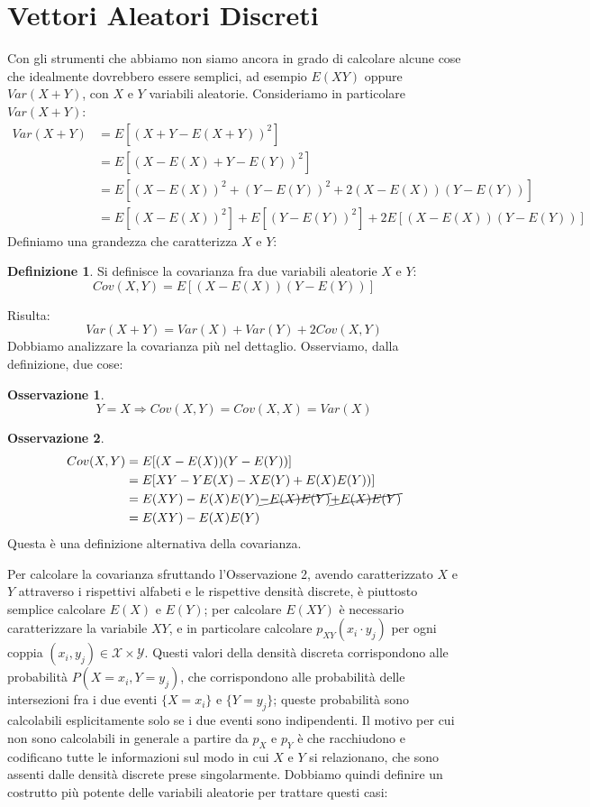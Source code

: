 \documentclass{article}
\theoremstyle{plain}
\theoremstyle{definition}
\newtheorem{definizione}{Definizione}[section]
\newtheorem{osservazione}{Osservazione}[section]
\theoremstyle{remark}
\begin{document}
\section{Vettori Aleatori Discreti} %
\label{sec:vettori_aleatori_discreti}
Con gli strumenti che abbiamo non siamo ancora in grado di calcolare alcune cose che idealmente dovrebbero essere semplici, ad esempio $E(XY)$ oppure $Var(X+Y)$, con $X$ e $Y$ variabili aleatorie. Consideriamo in particolare $Var(X+Y)$:
\begin{align*}
	Var(X+Y)&=E[(X+Y-E(X+Y))^2]\\
	&=E[(X-E(X)+Y-E(Y))^2]\\
	&=E[(X-E(X))^2+(Y-E(Y))^2+2(X-E(X))(Y-E(Y))]\\
	&=E[(X-E(X))^2]+E[(Y-E(Y))^2]+2E[(X-E(X))(Y-E(Y))]
\end{align*}
Definiamo una grandezza che caratterizza $X$ e $Y$:
\begin{definizione}
	Si definisce la covarianza fra due variabili aleatorie $X$ e $Y$:
	\begin{equation*}
		Cov(X,Y)=E[(X-E(X))(Y-E(Y))]
	\end{equation*}
\end{definizione}
Risulta:
\begin{equation*}
	Var(X+Y)=Var(X)+Var(Y)+2Cov(X,Y)
\end{equation*}
Dobbiamo analizzare la covarianza più nel dettaglio. Osserviamo, dalla definizione, due cose:
\begin{osservazione}
	\begin{equation*}
		Y=X \Rightarrow Cov(X,Y)=Cov(X,X)=Var(X)
	\end{equation*}
\end{osservazione}
\begin{osservazione}
	\begin{align*}
		Cov(X,Y)&=E[(X-E(X))(Y-E(Y))]\\
		&=E[XY-YE(X)-XE(Y)+E(X)E(Y))]\\
		&=E(XY)-E(X)E(Y)\cancel{-E(X)E(Y)}\cancel{+E(X)E(Y)}\\
		&=E(XY)-E(X)E(Y)
	\end{align*}
	Questa è una definizione alternativa della covarianza.
\end{osservazione}
Per calcolare la covarianza sfruttando l'Osservazione 2, avendo caratterizzato $X$ e $Y$ attraverso i rispettivi alfabeti e le rispettive densità discrete, è piuttosto semplice calcolare $E(X)$ e $E(Y)$; per calcolare $E(XY)$ è necessario caratterizzare la variabile $XY$, e in particolare calcolare $p_{XY}(x_i\cdot y_j)$ per ogni coppia $(x_i,y_j)\in\mathcal{X}\times\mathcal{Y}$. Questi valori della densità discreta corrispondono alle probabilità $P(X=x_i,Y=y_j)$, che corrispondono alle probabilità delle intersezioni fra i due eventi $\{X=x_i\}$ e $\{Y=y_j\}$; queste probabilità sono calcolabili esplicitamente solo se i due eventi sono indipendenti. Il motivo per cui non sono calcolabili in generale a partire da $p_X$ e $p_Y$ è che racchiudono e codificano tutte le informazioni sul modo in cui $X$ e $Y$ si relazionano, che sono assenti dalle densità discrete prese singolarmente. Dobbiamo quindi definire un costrutto più potente delle variabili aleatorie per trattare questi casi:
\end{document}
